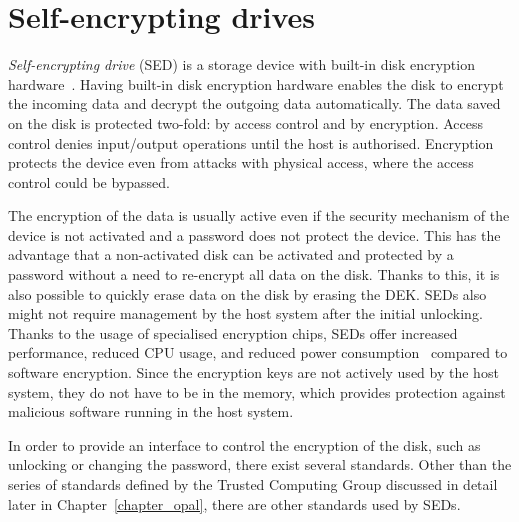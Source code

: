 \section{Self-encrypting drives}

\emph{Self-encrypting drive} (SED) is a storage device with built-in disk encryption hardware~\cite{tcg-use-case-white-paper}. Having built-in disk encryption hardware enables the disk to encrypt the incoming data and decrypt the outgoing data automatically. 
The data saved on the disk is protected two-fold: by access control and by encryption.
Access control denies input/output operations until the host is authorised.
Encryption protects the device even from attacks with physical access, where the access control could be bypassed.

The encryption of the data is usually active even if the security mechanism of the device is not activated and a password does not protect the device. This has the advantage that a non-activated disk can be activated and protected by a password without a need to re-encrypt all data on the disk. 
Thanks to this, it is also possible to quickly erase data on the disk by erasing the DEK.
SEDs also might not require management by the host system after the initial unlocking. 
Thanks to the usage of specialised encryption chips, SEDs offer increased performance, reduced CPU usage, and reduced power consumption~\cite{comparing_the_power} compared to software encryption.
Since the encryption keys are not actively used by the host system, they do not have to be in the memory, which provides protection against malicious software running in the host system. 

In order to provide an interface to control the encryption of the disk, such as unlocking or changing the password, there exist several standards. Other than the series of standards defined by the Trusted Computing Group discussed in detail later in Chapter~\ref{chapter_opal}, there are other standards used by SEDs.





